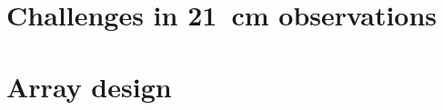 \section{Challenges in 21~cm observations}
\label{sec:challenges}

\section{Array design}
\label{sec:design}





